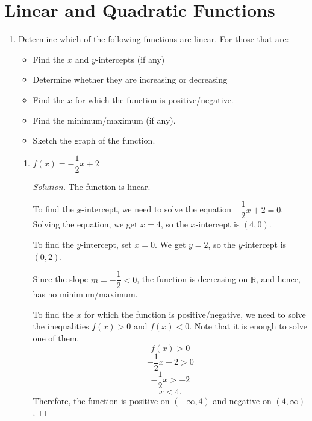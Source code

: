 \documentclass[12pt]{article}
\newenvironment{solution}{\begin{proof}[Solution]}{\end{proof}}
\begin{document}
	\newpage
	\section{Linear and Quadratic Functions}
		\begin{enumerate}
		\item Determine which of the following functions are linear. For those that are:
		\begin{itemize} 
			\item Find the $x$ and $y$-intercepts (if any)
			\item Determine whether they are increasing or decreasing
			\item Find the $x$ for which the function is positive/negative.
			\item Find the minimum/maximum (if any).
			\item Sketch the graph of the function.
		\end{itemize}
		\begin{enumerate}
			\item $f(x)=-\dfrac{1}{2}x+2$
		
			\begin{solution}
				
				The function is linear. 
				
				To find the $x$-intercept, we need to solve the equation $-\dfrac{1}{2}x+2=0$. Solving the equation, we get $x=4$, so the $x$-intercept is $(4,0)$.
				
				To find the $y$-intercept, set $x=0$. We get $y=2$, so the $y$-intercept is $(0,2)$. 
				
				Since the slope $m=-\dfrac{1}{2}<0$, the function is decreasing on $\mathbb{R}$, and hence, has no minimum/maximum.
				
				To find the $x$ for which the function is positive/negative, we need to solve the inequalities $f(x)>0$ and $f(x)<0$. Note that it is enough to solve one of them.
				$$f(x)>0$$
				$$-\dfrac{1}{2}x+2>0$$
				$$-\dfrac{1}{2}x>-2$$
				$$x<4.$$
				Therefore, the function is positive on $(-\infty,4)$ and negative on $(4,\infty)$.
				
				
\end{solution}
\end{enumerate}
\end{enumerate}
\end{document}
